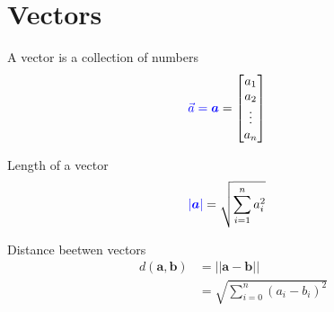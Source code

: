 \documentclass[handout]{beamer}
\begin{document}
%
%


\section{Vectors}
\begin{frame}{A vector is a collection of numbers}
    \Huge
    \begin{align*} 
        \textcolor{blue}{\vec{a} = \boldsymbol{a}} &= \begin{bmatrix}
           a_{1}  \\
           a_{2}  \\
           \vdots \\
           a_{n}  
         \end{bmatrix}
    \end{align*}
\end{frame}


\begin{frame}{Length of a vector}
    \huge
    \begin{align*}
        \textcolor{blue}{|\boldsymbol{a}|}   &= \sqrt{\sum^{n}_{i=1} a_i^2}
    \end{align*}
\end{frame}

\begin{frame}{Distance beetwen vectors}
    \Large
    \begin{align*}
        d(\boldsymbol{a}, \boldsymbol{b}) &= ||\boldsymbol{a} - \boldsymbol{b}||\\
                                          &= \sqrt{\sum_{i=0}^n (a_{i} - b_{i})^2}
    \end{align*}
\end{frame}
\end{document}
